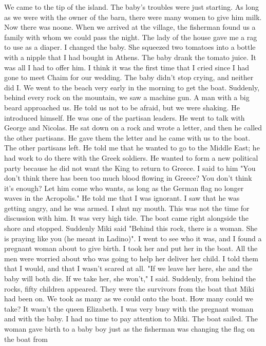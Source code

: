 We came to the tip of the island. The baby's troubles were 
just starting. As long as we were with the owner of the barn, there 
were many women to give him milk. Now there was noone. When we arrived 
at the village, the fisherman found us a family with whom we could pass 
the night. The lady of the house gave me a rag to use as a diaper. I 
changed the baby. She squeezed two tomatoes into a bottle with a nipple 
that I had bought in Athens. The baby drank the tomato juice. It was all 
I had to offer him. I think it was the first time that I cried since I 
had gone to meet Chaim for our wedding. The baby didn't stop crying, and 
neither did I. 
We went to the beach very early in the morning to get the boat. Suddenly, behind every rock on the mountain, we saw a machine gun. A man with 
a big beard approached us. He told us not to be afraid, but we were shaking. He introduced himself. He was one of the partisan leaders. He went to talk with George and Nicolas. He sat down on a rock and wrote a letter, and then he called the other partisans. He gave them the letter 
and he came with us to the boat. The other partisans left. 
He told me that he wanted to go to the Middle East; he had work to do 
there with the Greek soldiers. He wanted to form a new political party 
because he did not want the King to return to Greece. I said to him "You 
don't think there has been too much blood flowing in Greece? You don't 
think it's enough? Let him come who wants, as long as the German flag no 
longer waves in the Acropolis." He told me that I was ignorant. I saw 
that he was getting angry, and he was armed. I shut my mouth. This was 
not the time for discussion with him. 
It was very high tide. The boat came right alongside the shore 
and stopped. Suddenly Miki said "Behind this rock, there is a woman. She 
is praying like you (he meant in Ladino)". I went to see who it was, and 
I found a pregnant woman about to give birth. I took her and put her in 
the boat. All the men were worried about who was going to help her deliver her child. I told them that I would, and that I wasn’t scared at all. "If we leave her here, she and the baby will both die. If we take her, she won't," I said. Suddenly, from behind the rocks, fifty children appeared. They were the survivors from the boat that Miki had been 
on. We took as many as we could onto the boat. How many could we take? 
It wasn't the queen Elizabeth. 
I was very busy with the pregnant woman and with the baby. I had no 
time to pay attention to Miki. The boat sailed. The woman gave birth 
to a baby boy just as the fisherman was changing the flag on the boat from 
